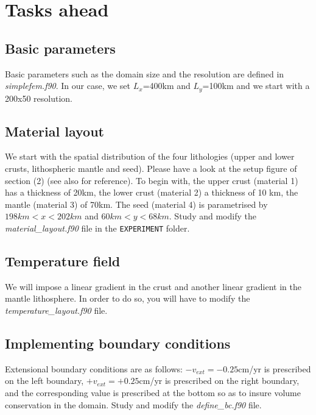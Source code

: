 \documentclass[a4paper]{article}
\begin{document}
\section{Tasks ahead}

\subsection{Basic parameters}

Basic parameters such as the domain size and the resolution are defined in {\sl simplefem.f90}.
In our case, we set $L_x$=400km and $L_y$=100km and we start with a 200x50 resolution. 


\subsection{Material layout}

We start with the spatial distribution of the four lithologies (upper and lower crusts, lithospheric mantle and seed). 
Please have a look at the setup figure of section (2) (see also \cite{nabu15} for reference). 
To begin with, the upper crust (material 1) has a thickness of 20km, the lower crust (material 2) a thickness of 10 km, 
the mantle (material 3) of 70km. The seed (material 4) is parametrised by $198km<x<202km$ and $60km<y<68km$.
Study and modify the {\sl material\_layout.f90} file in the {\tt EXPERIMENT} folder. 

\subsection{Temperature field}

We will impose a linear gradient in the crust and another linear gradient in the mantle lithosphere.
In order to do so, you will have to modify the {\sl temperature\_layout.f90} file.


\subsection{Implementing boundary conditions}

Extensional boundary conditions are as follows: 
$-v_{ext}=-0.25$cm/yr is prescribed on the left boundary,
$+v_{ext}=+0.25$cm/yr is prescribed on the right boundary,
and the corresponding value is prescribed at the bottom so as to insure volume conservation in the domain.
Study and modify the {\sl define\_bc.f90} file.
\end{document}
